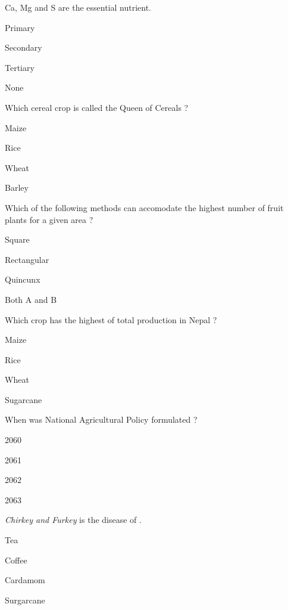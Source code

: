 \begin{questions}
\question Ca, Mg and S are the \fillin[][3cm] essential nutrient.
\begin{items}
\item Primary
\item* Secondary
\item Tertiary
\item None
\end{items}

\question Which cereal crop is called the Queen of Cereals ?
\begin{items}
\item* Maize
\item Rice
\item Wheat
\item Barley
\end{items}

\question Which of the following methods can accomodate the highest number of fruit plants for a given area ?
\begin{items}
\item Square
\item Rectangular
\item* Quincunx
\item Both A and B
\end{items}

\question Which crop has the highest of total production in Nepal ?
\begin{items}
\item Maize
\item* Rice
\item Wheat
\item Sugarcane
\end{items}

\question When was National Agricultural Policy formulated ?
\begin{items}
\item 2060
\item* 2061
\item 2062
\item 2063
\end{items}

\question \textit{Chirkey and Furkey} is the disease of \fillin[][3cm].
\begin{items}
\item Tea
\item Coffee
\item* Cardamom
\item Surgarcane
\end{items}


\end{questions}
